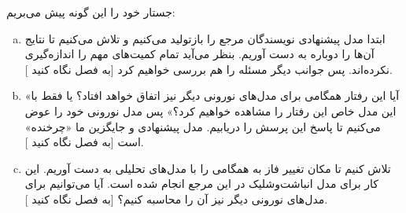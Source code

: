 
جستار خود را این گونه پیش می‌بریم:
\begin{enumerate}[(a)]
	\item
	ابتدا مدل پیشنهادی نویسندگان مرجع \cite{PhysRevLett.105.158104} را بازتولید می‌کنیم و تلاش می‌کنیم تا نتایج آن‌ها را دوباره به دست آوریم. بنظر می‌آید تمام کمیت‌های مهم را اندازه‌گیری نکرده‌اند. پس جوانب دیگر مسئله را هم بررسی خواهیم کرد [به فصل 
	نگاه کنید
	].
	\item 
	«آیا این رفتار همگامی برای مدل‌های نورونی دیگر نیز اتفاق خواهد افتاد؟ یا فقط با این مدل خاص این رفتار را مشاهده خواهیم کرد؟» پس مدل نورونی خود را عوض می‌کنیم تا پاسخ این پرسش را دریابیم. مدل پیشنهادی و جایگزین ما «چرخنده» است [به فصل 
	نگاه کنید
	].
	\item 
	تلاش کنیم تا مکان تغییر فاز به همگامی را با مدل‌های تحلیلی به دست آوریم. این کار برای مدل انباشت‌وشلیک در این مرجع 
	\cite{brunel2000dynamics}
	انجام شده است. آیا می‌توانیم برای مدل‌های نورونی دیگر نیز آن را محاسبه کنیم؟ [به فصل 
	نگاه کنید
	].
\end{enumerate}
